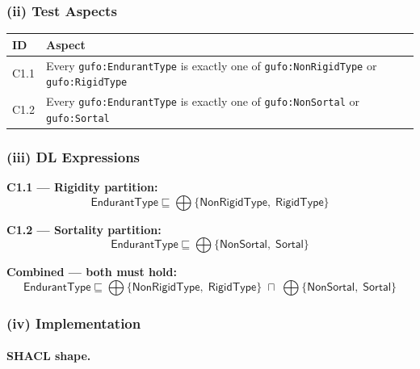 \documentclass[12pt,a4paper]{article}
\newcommand{\gufoclass}[1]{\nolinkurl{gufo:#1}}
\begin{document}
\subsubsection*{(ii) Test Aspects}

\begin{tabular}{lL{9.5cm}}
  \toprule
  \textbf{ID} & \textbf{Aspect} \\
  \midrule
  C1.1 & Every \gufoclass{EndurantType} is exactly one of
         \gufoclass{NonRigidType} or \gufoclass{RigidType} \\
  C1.2 & Every \gufoclass{EndurantType} is exactly one of
         \gufoclass{NonSortal} or \gufoclass{Sortal} \\
  \bottomrule
\end{tabular}

\subsubsection*{(iii) DL Expressions}

\textbf{C1.1 --- Rigidity partition:}
\begin{equation*}
  \mathsf{EndurantType} \sqsubseteq
  \bigoplus\{\mathsf{NonRigidType},\;\mathsf{RigidType}\}
\end{equation*}

\textbf{C1.2 --- Sortality partition:}
\begin{equation*}
  \mathsf{EndurantType} \sqsubseteq
  \bigoplus\{\mathsf{NonSortal},\;\mathsf{Sortal}\}
\end{equation*}

\textbf{Combined --- both must hold:}
\begin{equation*}
  \mathsf{EndurantType} \sqsubseteq
  \bigoplus\{\mathsf{NonRigidType},\;\mathsf{RigidType}\}
  \;\sqcap\;
  \bigoplus\{\mathsf{NonSortal},\;\mathsf{Sortal}\}
\end{equation*}

\subsubsection*{(iv) Implementation}

\paragraph{SHACL shape.}
\end{document}
